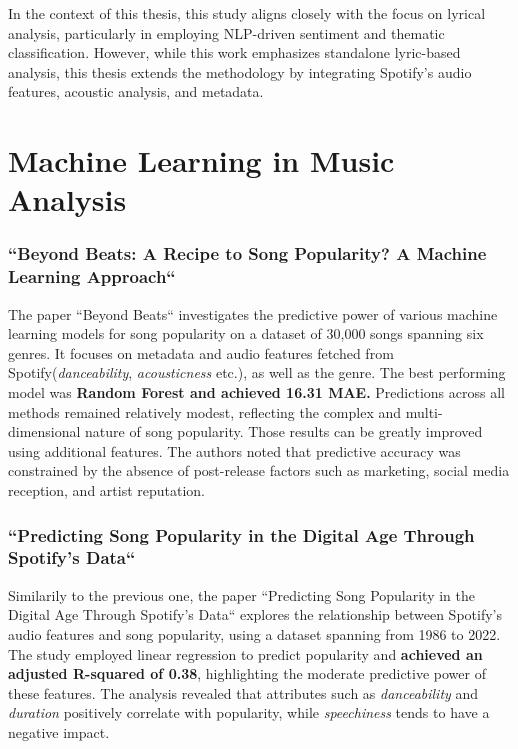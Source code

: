 In the context of this thesis, this study aligns closely with the focus on
lyrical analysis, particularly in employing NLP-driven sentiment and thematic
classification. However, while this work emphasizes standalone lyric-based
analysis, this thesis extends the methodology by integrating Spotify’s audio
features, acoustic analysis, and metadata. 


\section{Machine Learning in Music Analysis}
\label{sec:machinelearningfeaturesinmusicanalysis}

\subsubsection*{``Beyond Beats: A Recipe to Song Popularity? A Machine Learning Approach``}
\cite{beyond_beats}
The paper ``Beyond Beats`` investigates the predictive power of various machine
learning models for song popularity on a dataset of 30,000 songs spanning six
genres. It focuses on metadata and audio features fetched from
Spotify(\textit{danceability}, \textit{acousticness} etc.), as well as the
genre. The best performing model was \textbf{Random Forest and achieved 16.31 MAE.}
Predictions across all methods remained relatively modest, reflecting the
complex and multi-dimensional  nature of song popularity. Those results can be
greatly improved using additional features. The authors noted that predictive
accuracy was constrained by the absence of post-release factors such as
marketing, social media reception, and artist reputation.


\subsubsection*{``Predicting Song Popularity in the Digital Age Through
Spotify’s Data``} \cite{predicting_song_popularity_2024} Similarily to the previous
one, the paper ``Predicting Song Popularity in the Digital Age Through Spotify’s
Data`` explores the relationship between Spotify's audio features  and song
popularity, using a dataset spanning from 1986 to 2022. The study employed
linear regression to predict popularity and \textbf{achieved an adjusted
R-squared of 0.38}, highlighting the moderate predictive power of these
features. The analysis revealed that attributes such as \textit{danceability}
and \textit{duration} positively correlate with popularity, while
\textit{speechiness} tends to have a negative impact.
